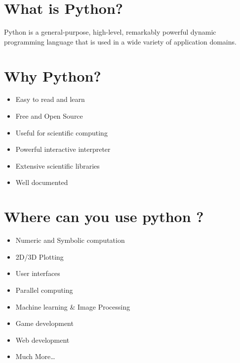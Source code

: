 \documentclass[final]{beamer}
\begin{document}
\begin{frame}[t]
\begin{multicols}{2}

\section{What is Python?}

Python is a general-purpose, high-level, remarkably powerful dynamic
programming language that is used in a wide variety of application
domains.


\section{Why Python?}
\begin{itemize}
\item {Easy to read and learn}
\item {Free and Open Source}
\item {Useful for scientific computing}
\item {Powerful interactive interpreter}
\item {Extensive scientific libraries}
\item {Well documented}
\end{itemize}


\section{Where can you use python ?}
\begin{itemize}
\item {Numeric and Symbolic computation}
\item {2D/3D Plotting}
\item {User interfaces}
\item {Parallel computing}
\item {Machine learning & Image Processing}
\item {Game development}
\item {Web development}
\item {Much More…}  
\end{itemize}


\end{multicols}
\end{frame}
\end{document}
